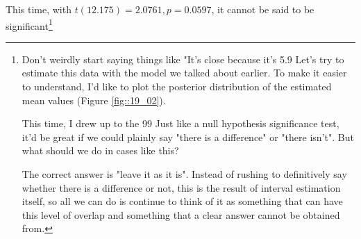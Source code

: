 \documentclass{ltjsbook}
\begin{document}


This time, with $t(12.175)=2.0761,p=0.0597$, it cannot be said to be significant\footnote{Don't weirdly start saying things like "It's close because it's 5.9%
Let's try to estimate this data with the model we talked about earlier. To make it easier to understand, I'd like to plot the posterior distribution of the estimated mean values (Figure \ref{fig::19_02}).



This time, I drew up to the 99%
Just like a null hypothesis significance test, it'd be great if we could plainly say "there is a difference" or "there isn't". But what should we do in cases like this?

The correct answer is "leave it as it is". Instead of rushing to definitively say whether there is a difference or not, this is the result of interval estimation itself, so all we can do is continue to think of it as something that can have this level of overlap and something that a clear answer cannot be obtained from.

}
\end{document}

